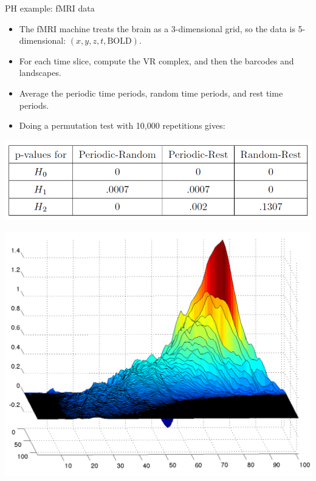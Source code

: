 \documentclass[usenames,dvipsnames,aspectratio=1610]{beamer}
\begin{document}
\begin{frame}{PH example: fMRI data}
  \begin{itemize}
    \item The fMRI machine treats the brain as a 3-dimensional grid, so 
      the data is 5-dimensional: $(x,y,z,t,\mathrm{BOLD})$.
    \item For each time slice, compute the VR complex, and then the
      barcodes and landscapes.
    \item Average the periodic time periods, random time periods, and rest time periods.
    \item Doing a permutation test with 10,000 repetitions gives:
  \end{itemize}
  \begin{minipage}{0.7\textwidth}
    \centering
    \includegraphics[scale=0.4]{images/ptest.png}
  \end{minipage}
  \begin{minipage}{0.25\textwidth}
    \centering
    \includegraphics[scale=0.15]{images/pl_h1.png}
  \end{minipage}
\end{frame}
\end{document}
